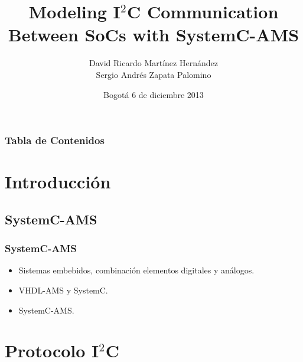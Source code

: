\documentclass[pstricks,serif, 10pt]{beamer}
\title[Comunicación SoC-SystemC]{Modeling I$^2$C Communication Between SoCs with SystemC-AMS}
\author[Martínez, Zapata]{David Ricardo Martínez Hernández\\
			   Sergio Andrés Zapata Palomino}
\institute[UNAL]{Universidad Nacional de Colombia}
\date[06/12/2013]{Bogotá 6 de diciembre 2013}
\begin{document}
\begin{frame}
  \titlepage
\end{frame}

\begin{frame}[allowframebreak]
 \frametitle{Tabla de Contenidos}
 \tableofcontents
\end{frame}

\section{Introducción}
\subsection{SystemC-AMS}
\begin{frame}[allowframebreak]
 \frametitle{SystemC-AMS}
 \begin{itemize}
  \item Sistemas embebidos, combinación elementos digitales y análogos. 
  \item VHDL-AMS y SystemC.
  \item SystemC-AMS.
 \end{itemize}
\end{frame}

\section[I$^2$C]{Protocolo I$^2$C}
\end{document}
